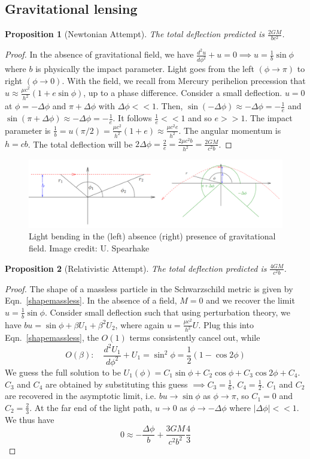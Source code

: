 \documentclass[a4paper]{article}
\theoremstyle{new}
\newtheorem{prop}{Proposition}[section]
\begin{document}
\subsection{Gravitational lensing}
\begin{prop}[Newtonian Attempt]
The total deflection predicted is $\frac{2GM}{bc^2}$.
\end{prop}
\begin{proof}
In the absence of gravitational field, we have $\frac{d^2u}{d\phi^2}+u=0\implies u=\frac{1}{b}\sin\phi$ where $b$ is physically the impact parameter. Light goes from the left $(\phi\rightarrow\pi)$ to right $(\phi\rightarrow 0)$. With the field, we recall from Mercury perihelion precession that $u\approx\frac{\mu c^2}{h^2}(1+e\sin\phi)$, up to a phase difference. Consider a small deflection. $u=0$ at $\phi=-\Delta\phi$ and $\pi+\Delta\phi$ with $\Delta\phi<<1$. Then, $\sin(-\Delta\phi)\approx-\Delta\phi=-\frac{1}{e}$ and $\sin(\pi+\Delta\phi)\approx-\Delta\phi=-\frac{1}{e}$. It follows $\frac{1}{e}<<1$ and so $e>>1$. The impact parameter is $\frac{1}{b}=u(\pi/2)=\frac{\mu c^2}{h^2}(1+e)\approx\frac{\mu c^2e}{h^2}$. The angular momentum is $h=cb$. The total deflection will be $2\Delta\phi=\frac{2}{e}=\frac{2\mu c^2b}{h^2}=\frac{2GM}{c^2b}$.
\end{proof}
\begin{figure}[H]
    \centering
    \includegraphics[width=\linewidth]{deflection.PNG}
    \caption{Light bending in the (left) absence (right) presence of gravitational field. Image credit: U. Spearhake}
\end{figure}
\begin{prop}[Relativistic Attempt]
The total deflection predicted is $\frac{4GM}{c^2b}$.
\end{prop}
\begin{proof}
The shape of a massless particle in the Schwarzschild metric is given by Eqn.~\ref{shapemassless}. In the absence of a field, $M=0$ and we recover the limit $u=\frac{1}{b}\sin\phi$. Consider small deflection such that using perturbation theory, we have $bu=\sin\phi+\beta U_1+\beta^2U_2$, where again $u=\frac{\mu c^2}{h^2}U$. Plug this into Eqn.~\ref{shapemassless}, the $O(1)$ terms consistently cancel out, while
$$O(\beta):\quad\frac{d^2U_1}{d\phi^2}+U_1=\sin^2\phi=\frac{1}{2}(1-\cos2\phi)$$
We guess the full solution to be $U_1(\phi)=C_1\sin\phi+C_2\cos\phi+C_3\cos2\phi+C_4$. $C_3$ and $C_4$ are obtained by substituting this guess $\implies C_3=\frac{1}{6}$, $C_4=\frac{1}{2}$. $C_1$ and $C_2$ are recovered in the asymptotic limit, i.e. $bu\rightarrow\sin\phi$ as $\phi\rightarrow\pi$, so $C_1=0$ and $C_2=\frac{2}{3}$.
At the far end of the light path, $u\rightarrow 0$ as $\phi\rightarrow-\Delta\phi$ where $|\Delta\phi|<<1$. We thus have
$$0\approx-\frac{\Delta\phi}{b}+\frac{3GM}{c^2b^2}\frac{4}{3}$$
\end{proof}
\end{document}
